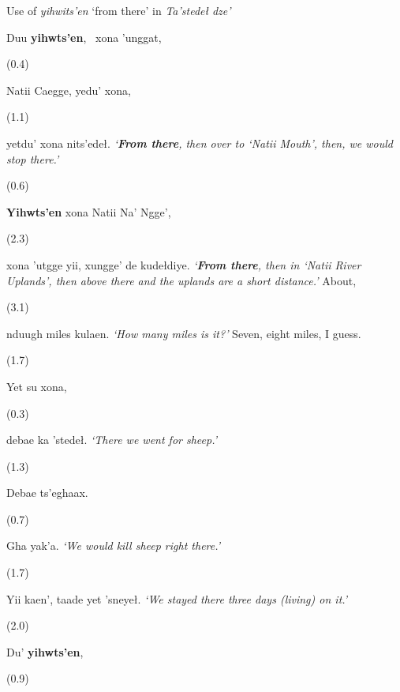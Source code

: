 \begin{exe}
\ex Use of \textit{yihwits’en} ‘from there’ in \textit{Ta’stedeł dze’}\label{berez-ex9}
\begin{xlist}
  	Duu \textbf{yihwts’en},
 \		xona ’unggat,
\sn \begin{flushright}(0.4)\end{flushright}
  			Natii Caegge,
  			yedu’ xona,
\sn \begin{flushright}(1.1)\end{flushright}
  			yetdu’ xona nits’edeł.
\glt	\textit{‘\textbf{From there}, then over to ‘Natii Mouth’, then, we would stop there.’}
\sn \begin{flushright}(0.6)\end{flushright}
  			\textbf{Yihwts’en} xona Natii Na’ Ngge’,
\sn \begin{flushright}(2.3)\end{flushright}
  xona ’utgge yii,
   			xungge’ de kudełdiye.
\glt	\textit{‘\textbf{From there}, then in ‘Natii River Uplands’, then above there and the uplands are a short distance.’}
 			About,
\sn \begin{flushright}(3.1)\end{flushright}
   			nduugh miles kulaen.
		\glt	\textit{‘How many miles is it?’}
   			Seven,
   			eight miles,
   			I guess.
\sn \begin{flushright}(1.7)\end{flushright}
   			Yet su xona,
\sn \begin{flushright}(0.3)\end{flushright}
   			debae ka ’stedeł.
		\glt	 \textit{‘There we went for sheep.’}
\sn \begin{flushright}(1.3)\end{flushright}
   			Debae ts’eghaax.
\sn \begin{flushright}(0.7)\end{flushright}
   			Gha yak’a.
		\glt 	\textit{‘We would kill sheep right there.’}
\sn \begin{flushright}(1.7)\end{flushright}
 	Yii kaen’,
   			taade yet ’sneyeł.
		\glt 	\textit{‘We stayed there three days (living) on it.’}
\sn \begin{flushright}(2.0)\end{flushright}
   			Du’ \textbf{yihwts’en},
\sn \begin{flushright}(0.9)\end{flushright}

\end{xlist}
\end{exe}
